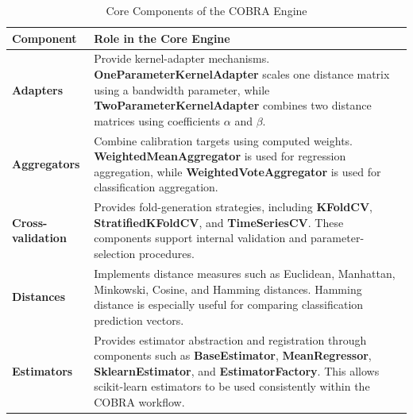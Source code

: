 \begin{table}[H]
      \centering
      \caption{Core Components of the COBRA Engine}
      \label{tab:cobra_core_engine_components}
      \begin{tabularx}{\textwidth}{lX}
            \toprule
            \textbf{Component}        & \textbf{Role in the Core Engine}                                                                                                                                                                                                                \\
            \midrule
            \textbf{Adapters}         &
            Provide kernel-adapter mechanisms. \textbf{OneParameterKernelAdapter} scales one distance matrix using a bandwidth parameter, while \textbf{TwoParameterKernelAdapter} combines two distance matrices using coefficients $\alpha$ and $\beta$.                              \\

            \textbf{Aggregators}      &
            Combine calibration targets using computed weights. \textbf{WeightedMeanAggregator} is used for regression aggregation, while \textbf{WeightedVoteAggregator} is used for classification aggregation.                                                                       \\

            \textbf{Cross-validation} &
            Provides fold-generation strategies, including \textbf{KFoldCV}, \textbf{StratifiedKFoldCV}, and \textbf{TimeSeriesCV}. These components support internal validation and parameter-selection procedures.                                                                    \\

            \textbf{Distances}        &
            Implements distance measures such as Euclidean, Manhattan, Minkowski, Cosine, and Hamming distances. Hamming distance is especially useful for comparing classification prediction vectors.                                                                                 \\

            \textbf{Estimators}       &
            Provides estimator abstraction and registration through components such as \textbf{BaseEstimator}, \textbf{MeanRegressor}, \textbf{SklearnEstimator}, and \textbf{EstimatorFactory}. This allows scikit-learn estimators to be used consistently within the COBRA workflow. \\


\end{tabularx}
\end{table}
